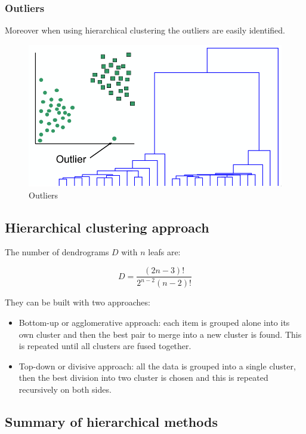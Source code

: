 			\subsubsection{Outliers}
			Moreover when using hierarchical clustering the outliers are easily identified.

			\begin{figure}[H]
				\includegraphics[width=\textwidth]{outliers}
				\caption{Outliers}
				\label{fig:dendrogram}
			\end{figure}

	\subsection{Hierarchical clustering approach}
	The number of dendrograms $D$ with $n$ leafs are:

	$$D = \frac{(2n-3)!}{2^{n-2}(n-2)!}$$

	They can be built with two approaches:

	\begin{multicols}{2}
		\begin{itemize}
			\item Bottom-up or agglomerative approach: each item is grouped alone into its own cluster and then the best pair to merge into a new cluster is found.
				This is repeated until all clusters are fused together.
			\item Top-down or divisive approach: all the data is grouped into a single cluster, then the best division into two cluster is chosen and this is repeated recursively on both sides.
		\end{itemize}
	\end{multicols}

	\subsection{Summary of hierarchical methods}

